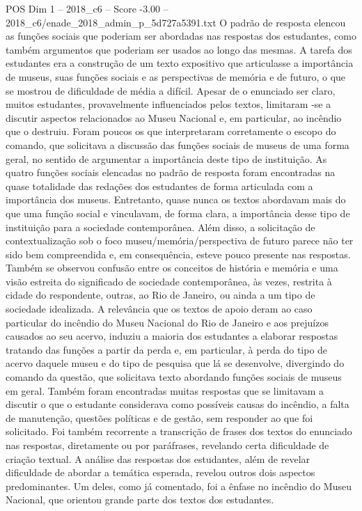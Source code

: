 \begin{textsample}{POS Dim 1 – 2018\_c6 – Score -3.00 – 2018\_c6/enade\_2018\_admin\_p\_5d727a5391.txt}
O padrão de resposta elencou as funções sociais que poderiam ser abordadas nas respostas dos estudantes, como também argumentos que poderiam ser usados ao longo das mesmas.
A tarefa dos estudantes era a construção de um texto expositivo que articulasse a importância de museus, suas funções sociais e as perspectivas de memória e de futuro, o que se mostrou de dificuldade de média a difícil.
Apesar de o enunciado ser claro, muitos estudantes, provavelmente influenciados pelos textos, limitaram -se a discutir aspectos relacionados ao Museu Nacional e, em particular, ao incêndio que o destruiu.
Foram poucos os que interpretaram corretamente o escopo do comando, que solicitava a discussão das funções sociais de museus de uma forma geral, no sentido de argumentar a importância deste tipo de instituição.
As quatro funções sociais elencadas no padrão de resposta foram encontradas na quase totalidade das redações dos estudantes de forma articulada com a importância dos museus.
Entretanto, quase nunca os textos abordavam mais do que uma função social e vinculavam, de forma clara, a importância desse tipo de instituição para a sociedade contemporânea.
Além disso, a solicitação de contextualização sob o foco museu/memória/perspectiva de futuro parece não ter sido bem compreendida e, em consequência, esteve pouco presente nas respostas.
Também se observou confusão entre os conceitos de história e memória e uma visão estreita do significado de sociedade contemporânea, às vezes, restrita à cidade do respondente, outras, ao Rio de Janeiro, ou ainda a um tipo de sociedade idealizada.
A relevância que os textos de apoio deram ao caso particular do incêndio do Museu Nacional do Rio de Janeiro e aos prejuízos causados ao seu acervo, induziu a maioria dos estudantes a elaborar respostas tratando das funções a partir da perda e, em particular, à perda do tipo de acervo daquele museu e do tipo de pesquisa que lá se desenvolve, divergindo do comando da questão, que solicitava texto abordando funções sociais de museus em geral.
Também foram encontradas muitas respostas que se limitavam a discutir o que o estudante considerava como possíveis causas do incêndio, a falta de manutenção, questões políticas e de gestão, sem responder ao que foi solicitado.
Foi também recorrente a transcrição de frases dos textos do enunciado nas respostas, diretamente ou por paráfrases, revelando certa dificuldade de criação textual.
A análise das respostas dos estudantes, além de revelar dificuldade de abordar a temática esperada, revelou outros dois aspectos predominantes.
Um deles, como já comentado, foi a ênfase no incêndio do Museu Nacional, que orientou grande parte dos textos dos estudantes.

\end{textsample}
